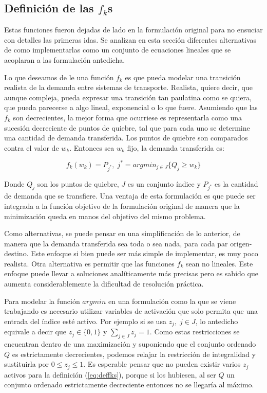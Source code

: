 \documentclass{article}
\begin{document}
  \subsection*{Definición de las $f_k$s}

  Estas funciones fueron dejadas de lado en la formulación original para no ensuciar con detalles las primeras idas. Se analizan en esta sección diferentes alternativas de como implementarlas como un conjunto de ecuaciones lineales que se acoplaran a las formulación antedicha.

  Lo que deseamos de le una función $f_k$ es que pueda modelar una transición realista de la demanda entre sistemas de transporte. Realista, quiere decir, que aunque compleja, pueda expresar una transición tan paulatina como se quiera, que pueda parecerse a algo lineal, exponencial o lo que fuere. Asumiendo que las $f_k$ son decrecientes, la mejor forma que ocurriese es representarla como una sucesión decreciente de puntos de quiebre, tal que para cada uno se determine una cantidad de demanda transferida. Los puntos de quiebre son comparados contra el valor de $w_k$. Entonces sea $w_k$ fijo, la demanda transferida es:

  \begin{equation}
    \label{eq:deffks}
    f_k(w_k) = P_{j^*},\; j^* = argmin_{j \in J} \{Q_j \geq w_k\}
  \end{equation}
  
  Donde $Q_j$ son los puntos de quiebre, $J$ es un conjunto índice y $P_{j^*}$ es la cantidad de demanda que se transfiere. Una ventaja de esta formulación es que puede ser integrada a la función objetivo de la formulación original de manera que la minimización queda en manos del objetivo del mismo problema.

  Como alternativas, se puede pensar en una simplificación de lo anterior, de manera que la demanda transferida sea toda o sea nada, para cada par origen-destino. Este enfoque si bien puede ser más simple de implementar, es muy poco realista. Otra alternativa es permitir que las funciones $f_k$ sean no lineales. Este enfoque puede llevar a soluciones analíticamente más precisas pero es sabido que aumenta considerablemente la dificultad de resolución práctica.

  Para modelar la función $argmin$ en una formulación como la que se viene trabajando es necesario utilizar variables de activación que solo permita que una entrada del índice esté activo. Por ejemplo si se usa $z_j,\; j \in J$, lo antedicho equivale a decir que $z_j \in \{0,1\}$ y $\sum_{j \in J} z_j = 1$. Como estas restricciones se encuentran dentro de una maximización y suponiendo que el conjunto ordenado $Q$ es estrictamente decrecientes, podemos relajar la restricción de integralidad y sustituirla por $0 \leq z_j \leq 1$. Es esperable pensar que no pueden existir varios $z_j$ activos para la definición (\ref{eq:deffks}), porque si los hubiesen, al ser $Q$ un conjunto ordenado estrictamente decreciente entonces no se llegaría al máximo.
\end{document}
